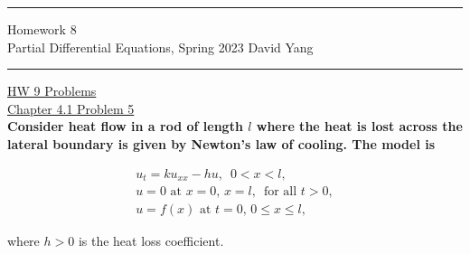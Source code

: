 \documentclass[11pt]{article}
\begin{document}
	\hrule
	\begin{center}
		{\Large Homework 8} \\ %
		\vspace{0.2cm}
		Partial Differential Equations, Spring 2023 \hfill David Yang %
	\end{center}

\hrule

\vspace{1em}


\underline{HW 9 Problems} \\

\underline{Chapter 4.1 Problem 5} \\

\textbf{Consider heat flow in a rod of length $l$ where the heat is lost across the lateral boundary is given by Newton's law of cooling. The model is} 

\[
\begin{array}{c}
    u_t = ku_{xx} - hu, \,\,\, 0 < x < l, \\
    u = 0 \text{ at } x =0, \, x=l, \, \text{ for all } t > 0,\\
    u = f(x) \text { at } t=0, \, 0 \leq x \leq l,
\end{array}
\]

where $h > 0$ is the heat loss coefficient. \\
\end{document}

